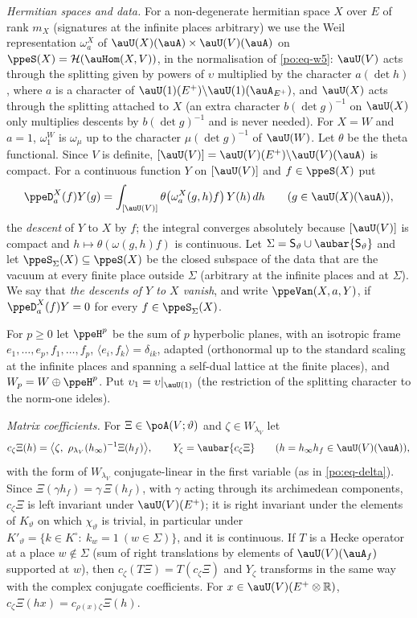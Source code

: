 \documentclass[10pt]{amsart}
\theoremstyle{definition}
\theoremstyle{remark}
\newcommand{\R}{\mathbb R}
\begin{document}
\emph{Hermitian spaces and data.} For a non-degenerate hermitian space $X$ over $E$ of rank
$m_X$ (signatures at the infinite places arbitrary) we use the Weil representation
$\omega^X_a$ of $\auU(X)(\auA)\times\auU(V)(\auA)$ on $\ppeS(X)=\mathcal H(\auHom(X,V))$, in the
normalisation of \eqref{po:eq-w5}: $\auU(V)$ acts through the splitting given by powers of
$\upsilon$ multiplied by the character $a(\det h)$, where $a$ is a character of
$\auU(1)(E^+)\backslash\auU(1)(\auA_{E^+})$, and $\auU(X)$ acts through the splitting attached to
$X$ (an extra character $b(\det g)^{-1}$ on $\auU(X)$ only multiplies descents by $b(\det g)^{-1}$
and is never needed). For $X=W$ and $a=1$, $\omega^W_1$ is $\omega_\mu$ up to the character
$\mu(\det g)^{-1}$ of $\auU(W)$. Let $\theta$ be the theta functional. Since $V$ is definite,
$[\auU(V)]=\auU(V)(E^+)\backslash\auU(V)(\auA)$ is compact. For a continuous function $Y$ on
$[\auU(V)]$ and $f\in\ppeS(X)$ put
\[
\ppeD^X_a(f)Y(g)=\int_{[\auU(V)]}\theta\bigl(\omega^X_a(g,h)f\bigr)\,Y(h)\,dh\qquad(g\in
\auU(X)(\auA)),
\]
the \emph{descent} of $Y$ to $X$ by $f$; the integral converges absolutely because $[\auU(V)]$
is compact and $h\mapsto\theta(\omega(g,h)f)$ is continuous. Let $\Sigma=\mathsf S_\vartheta\cup
\aubar{\mathsf S_\vartheta}$ and let $\ppeS_\Sigma(X)\subseteq\ppeS(X)$ be the closed subspace of
the data that are the vacuum at every finite place outside $\Sigma$ (arbitrary at the infinite
places and at $\Sigma$). We say that \emph{the descents of $Y$ to $X$ vanish}, and write
$\ppeVan(X,a,Y)$, if $\ppeD^X_a(f)Y=0$ for every $f\in\ppeS_\Sigma(X)$.

For $p\ge0$ let $\ppeH^p$ be the sum of $p$ hyperbolic planes, with an isotropic frame
$e_1,\dots,e_p,f_1,\dots,f_p$, $\langle e_i,f_k\rangle=\delta_{ik}$, adapted (orthonormal up to the
standard scaling at the infinite places and spanning a self-dual lattice at the finite places),
and $W_p=W\oplus\ppeH^p$. Put $\upsilon_1=\upsilon|_{\auU(1)}$ (the restriction of the splitting
character to the norm-one ideles).

\emph{Matrix coefficients.} For $\Xi\in\poA(V;\vartheta)$ and $\zeta\in W_{\lambda_V}$ let
\[
c_\zeta\Xi(h)=\bigl\langle\zeta,\ \rho_{\lambda_V}(h_\infty)^{-1}\Xi(h_f)\bigr\rangle,\qquad
Y_\zeta=\aubar{c_\zeta\Xi}\qquad(h=h_\infty h_f\in\auU(V)(\auA)),
\]
with the form of $W_{\lambda_V}$ conjugate-linear in the first variable (as in
\eqref{po:eq-delta}). Since $\Xi(\gamma h_f)=\gamma\,\Xi(h_f)$, with $\gamma$ acting through its
archimedean components, $c_\zeta\Xi$ is left invariant under $\auU(V)(E^+)$; it is right invariant
under the elements of $K_\vartheta$ on which $\chi_\vartheta$ is trivial, in particular under
$K'_\vartheta=\{k\in K^\circ:\ k_w=1\ (w\in\Sigma)\}$, and it is continuous. If $T$ is a Hecke
operator at a place $w\notin\Sigma$ (sum of right translations by elements of $\auU(V)(\auA_f)$
supported at $w$), then $c_\zeta(T\Xi)=T(c_\zeta\Xi)$ and $Y_\zeta$ transforms in the same way
with the complex conjugate coefficients. For $x\in\auU(V)(E^+\otimes\R)$,
$c_\zeta\Xi(hx)=c_{\rho(x)\zeta}\Xi(h)$.
\end{document}
